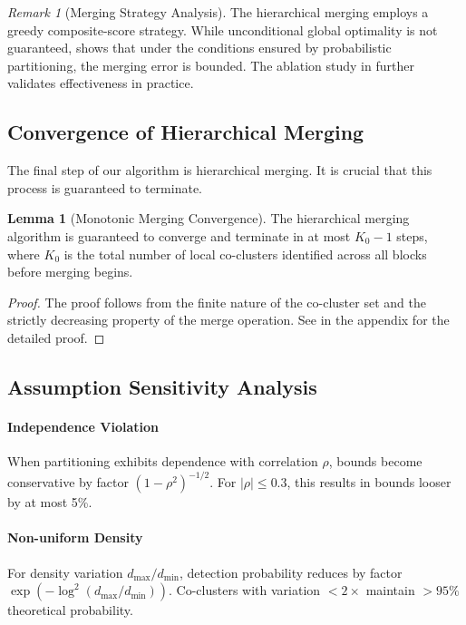 \documentclass[journal]{IEEEtran}
\theoremstyle{definition}
\newtheorem{lemma}[theorem]{Lemma}
\theoremstyle{remark} %
\newtheorem{remark}{Remark}
\begin{document}
{{\begin{remark}[Merging Strategy Analysis]
    The hierarchical merging employs a greedy composite-score strategy.
    While unconditional global optimality is not guaranteed,
     shows that under the conditions ensured by
    probabilistic partitioning, the merging error is bounded. The ablation
    study in  further validates effectiveness in practice.
\end{remark}
}

\subsection{Convergence of Hierarchical Merging}
\label{subsec:convergence-of-hierarchical-merging}
The final step of our algorithm is hierarchical merging. It is crucial that this process is guaranteed to terminate.

\begin{lemma}[Monotonic Merging Convergence]
    \label{lem:merging-convergence}
    The hierarchical merging algorithm is guaranteed to converge and terminate in at most $K_0 - 1$ steps, where $K_0$ is the total number of local co-clusters identified across all blocks before merging begins.
\end{lemma}
\begin{proof}
    The proof follows from the finite nature of the co-cluster set and the strictly decreasing property of the merge operation. See  in the appendix for the detailed proof.
\end{proof}

\subsection{Assumption Sensitivity Analysis}
\label{subsec:sensitivity-analysis}

\paragraph{Independence Violation}{When partitioning exhibits dependence with correlation $\rho$, bounds become conservative by factor $(1-\rho^2)^{-1/2}$. For $|\rho| \leq 0.3$, this results in bounds looser by at most 5\%.}

\paragraph{Non-uniform Density}{For density variation $d_{\max}/d_{\min}$, detection probability reduces by factor $\exp(-\log^2(d_{\max}/d_{\min}))$. Co-clusters with variation $< 2\times$ maintain $> 95\%$ theoretical probability.}

}
\end{document}
